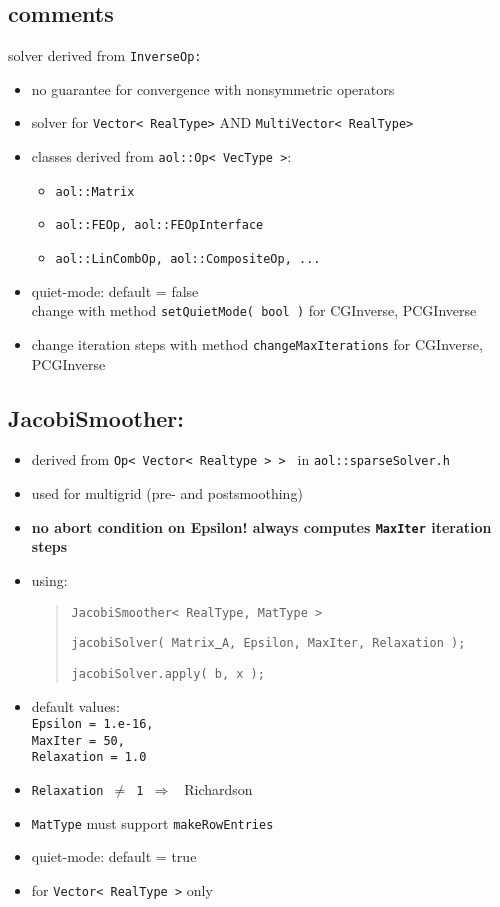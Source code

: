 
\subsection {comments}

solver derived from {\tt InverseOp: }
\begin{itemize}
\item no guarantee for convergence with nonsymmetric operators
\item solver for {\tt Vector< RealType>} AND {\tt MultiVector< RealType> }
\item classes derived from {\tt aol::Op< VecType >}:
\begin{itemize}
\item {\tt aol::Matrix }
\item {\tt aol::FEOp, aol::FEOpInterface }
\item {\tt aol::LinCombOp, aol::CompositeOp, ... }
\end{itemize}
\item quiet-mode: default = false \\
change with method {\tt setQuietMode( bool )} for CGInverse, PCGInverse
\item change iteration steps with method {\tt changeMaxIterations} for CGInverse, PCGInverse
\end{itemize}



\subsection{JacobiSmoother: }
\begin{itemize}
\item derived from {\tt Op< Vector< Realtype > > } in {\tt aol::sparseSolver.h}
\item used for multigrid (pre- and postsmoothing)
\item {\bf no abort condition on Epsilon! always computes {\tt MaxIter} iteration steps}
\item using: \begin{quote}{\tt JacobiSmoother< RealType, MatType > }
\begin{flushright} {\tt jacobiSolver( Matrix\underline{ }A, Epsilon, MaxIter, Relaxation );} \end{flushright}
{\tt jacobiSolver.apply( b, x );}
\end{quote}
\item default values: \\
{\tt Epsilon = 1.e-16, \\ MaxIter = 50, \\ Relaxation = 1.0}
\item {\tt Relaxation $\not=$ 1 $\Rightarrow$ } Richardson
\item {\tt MatType} must support {\tt makeRowEntries }
\item quiet-mode: default = true
\item for {\tt Vector< RealType >} only
\end{itemize}


